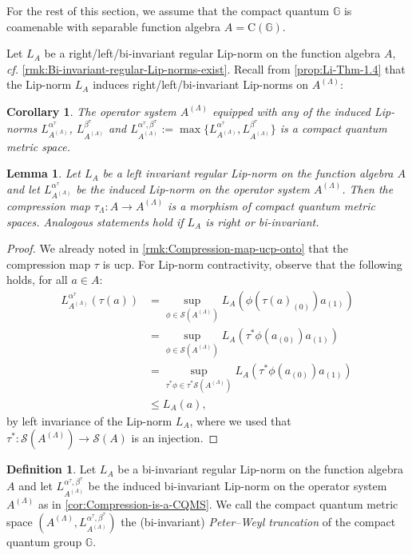 \documentclass{amsart}
\theoremstyle{plain}
\newtheorem{lemma}[theorem]{Lemma}
\newtheorem{corollary}[theorem]{Corollary}
\theoremstyle{definition}
\newtheorem{definition}[theorem]{Definition}
\theoremstyle{remark}
\begin{document}
	For the rest of this section, we assume that the compact quantum $\mathbb{G}$ is coamenable with separable function algebra $A = \mathrm{C}(\mathbb{G})$.
	
	Let $L_A$ be a right/left/bi-invariant regular Lip-norm on the function algebra $A$, \emph{cf.\@} \autoref{rmk:Bi-invariant-regular-Lip-norms-exist}.
	Recall from \autoref{prop:Li-Thm-1.4} that the Lip-norm $L_A$ induces right/left/bi-invariant Lip-norms on $A^{(\Lambda)}$:
	
	\begin{corollary}\label{cor:Compression-is-a-CQMS}
		The operator system $A^{(\Lambda)}$ equipped with any of the induced Lip-norms $L_{A^{(\Lambda)}}^{\alpha^\tau}$, $L_{A^{(\Lambda)}}^{\beta^\tau}$ and $L_{A^{(\Lambda)}}^{\alpha^\tau,\beta^\tau} := \max\{L_{A^{(\Lambda)}}^{\alpha^\tau},L_{A^{(\Lambda)}}^{\beta^\tau}\}$ is a compact quantum metric space.
	\end{corollary}
	
	\begin{lemma}\label{lem:Compression-map-morphism}
		Let $L_A$ be a left invariant regular Lip-norm on the function algebra $A$ and let $L_{A^{(\Lambda)}}^{\alpha^\tau}$ be the induced Lip-norm on the operator system $A^{(\Lambda)}$.
		Then the compression map $\tau_\Lambda : A \rightarrow A^{(\Lambda)}$ is a morphism of compact quantum metric spaces.
		Analogous statements hold if $L_A$ is right or bi-invariant.
	\end{lemma}
	
	\begin{proof}
		We already noted in \autoref{rmk:Compression-map-ucp-onto} that the compression map $\tau$ is ucp.
		For Lip-norm contractivity, observe that the following holds, for all $a \in A$:
		\begin{align}
			L_{A^{(\Lambda)}}^{\alpha^\tau}(\tau(a))
			&= \sup_{\phi \in \mathcal{S}(A^{(\Lambda)})} L_A(\phi(\tau(a)_{(0)})a_{(1)}) \\
			&= \sup_{\phi \in \mathcal{S}(A^{(\Lambda)})} L_A(\tau^*\phi(a_{(0)})a_{(1)}) \\
			&= \sup_{\tau^*\phi \in \tau^*\mathcal{S}(A^{(\Lambda)})} L_A(\tau^*\phi(a_{(0)})a_{(1)}) \\
			&\leq L_A(a),
		\end{align}
		by left invariance of the Lip-norm $L_A$, where we used that $\tau^* : \mathcal{S}(A^{(\Lambda)}) \rightarrow \mathcal{S}(A)$ is an injection.
	\end{proof}
	
	\begin{definition}
		Let $L_A$ be a bi-invariant regular Lip-norm on the function algebra $A$ and let $L_{A^{(\Lambda)}}^{\alpha^\tau,\beta^\tau}$ be the induced bi-invariant Lip-norm on the operator system $A^{(\Lambda)}$ as in \autoref{cor:Compression-is-a-CQMS}.
		We call the compact quantum metric space $(A^{(\Lambda)},	L_{A^{(\Lambda)}}^{\alpha^\tau,\beta^\tau})$ the (bi-invariant) \emph{Peter--Weyl truncation} of the compact quantum group $\mathbb{G}$.
	\end{definition}
	
\end{document}

